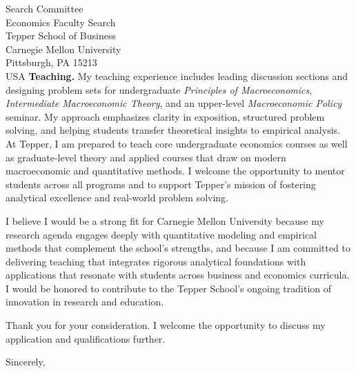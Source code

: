 \documentclass[11pt,letterpaper]{letter}
\begin{document}
\begin{letter}{Search Committee \\
Economics Faculty Search \\
Tepper School of Business \\
Carnegie Mellon University \\
Pittsburgh, PA 15213 \\ USA}
\textbf{Teaching.} My teaching experience includes leading discussion sections and designing problem sets for undergraduate \textit{Principles of Macroeconomics}, \textit{Intermediate Macroeconomic Theory}, and an upper-level \textit{Macroeconomic Policy} seminar. My approach emphasizes clarity in exposition, structured problem solving, and helping students transfer theoretical insights to empirical analysis. At Tepper, I am prepared to teach core undergraduate economics courses as well as graduate-level theory and applied courses that draw on modern macroeconomic and quantitative methods. I welcome the opportunity to mentor students across all programs and to support Tepper’s mission of fostering analytical excellence and real-world problem solving.

I believe I would be a strong fit for Carnegie Mellon University because my research agenda engages deeply with quantitative modeling and empirical methods that complement the school’s strengths, and because I am committed to delivering teaching that integrates rigorous analytical foundations with applications that resonate with students across business and economics curricula. I would be honored to contribute to the Tepper School’s ongoing tradition of innovation in research and education.

Thank you for your consideration. I welcome the opportunity to discuss my application and qualifications further.

\closing{Sincerely,}

\end{letter}
\end{document}
